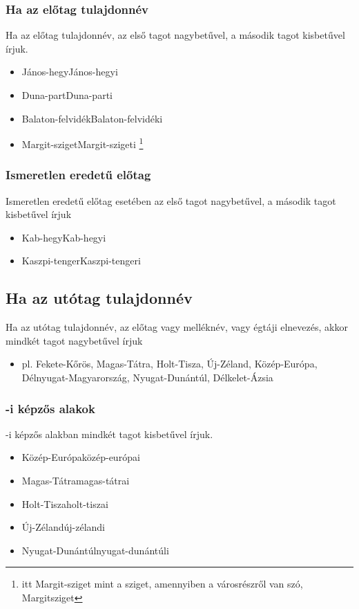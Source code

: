 \documentclass{article}
\begin{document}
\subsubsection{Ha az előtag tulajdonnév}
Ha az előtag tulajdonnév, az első tagot nagybetűvel, a második tagot kisbetűvel írjuk.
\begin{itemize}
    \item János-hegy\textrightarrow János-hegyi
    \item Duna-part\textrightarrow Duna-parti
    \item Balaton-felvidék\textrightarrow Balaton-felvidéki
    \item Margit-sziget\textrightarrow Margit-szigeti \footnote{itt Margit-sziget mint a sziget, amennyiben a városrészről van szó, Margitsziget}
\end{itemize}

\subsubsection{Ismeretlen eredetű előtag}
Ismeretlen eredetű előtag esetében az első tagot nagybetűvel, a második tagot kisbetűvel írjuk
\begin{itemize}
    \item Kab-hegy\textrightarrow Kab-hegyi
    \item Kaszpi-tenger\textrightarrow Kaszpi-tengeri
\end{itemize}

\subsection{Ha az utótag tulajdonnév}
Ha az utótag tulajdonnév, az előtag vagy melléknév, vagy égtáji elnevezés, akkor mindkét tagot nagybetűvel írjuk
\begin{itemize}
    \item pl. Fekete-Kőrös, Magas-Tátra, Holt-Tisza, Új-Zéland, Közép-Európa, Délnyugat-Magyarország, Nyugat-Dunántúl, Délkelet-Ázsia
\end{itemize}

\subsubsection{-i képzős alakok}
-i képzős alakban mindkét tagot kisbetűvel írjuk.
\begin{itemize}
    \item Közép-Európa\textrightarrow közép-európai
    \item Magas-Tátra\textrightarrow magas-tátrai
    \item Holt-Tisza\textrightarrow holt-tiszai
    \item Új-Zéland\textrightarrow új-zélandi
    \item Nyugat-Dunántúl\textrightarrow nyugat-dunántúli
\end{itemize}
\end{document}
